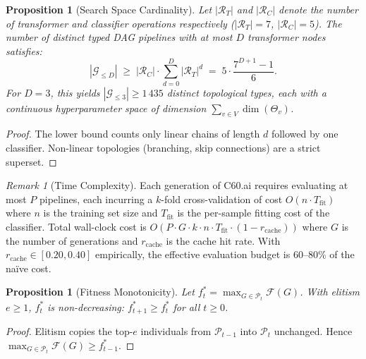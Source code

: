 \documentclass{article}
\theoremstyle{definition}
\theoremstyle{plain}
\newtheorem{proposition}[definition]{Proposition}
\theoremstyle{remark}
\newtheorem{remark}[definition]{Remark}
\begin{document}
\begin{proposition}[Search Space Cardinality]
\label{prop:space}
Let $|\mathcal{R}_T|$ and $|\mathcal{R}_C|$ denote the number of transformer
and classifier operations respectively ($|\mathcal{R}_T| = 7$,
$|\mathcal{R}_C| = 5$).
The number of distinct typed DAG pipelines with at most $D$ transformer
nodes satisfies:
\begin{equation}
  |\mathcal{G}_{\leq D}| \;\geq\;
    |\mathcal{R}_C| \cdot \sum_{d=0}^{D} |\mathcal{R}_T|^d
    \;=\; 5 \cdot \frac{7^{D+1} - 1}{6}.
  \label{eq:space}
\end{equation}
For $D = 3$, this yields $|\mathcal{G}_{\leq 3}| \geq 1\,435$
distinct \emph{topological types}, each with a continuous hyperparameter
space of dimension $\sum_{v \in V} \dim(\Theta_v)$.
\end{proposition}

\begin{proof}
The lower bound counts only linear chains of length $d$ followed by one
classifier.
Non-linear topologies (branching, skip connections) are a strict superset.
\end{proof}

\begin{remark}[Time Complexity]
\label{rem:complexity}
Each generation of C60.ai requires evaluating at most $P$ pipelines,
each incurring a $k$-fold cross-validation of cost $O(n \cdot T_\mathrm{fit})$
where $n$ is the training set size and $T_\mathrm{fit}$ is the per-sample
fitting cost of the classifier.
Total wall-clock cost is $O(P \cdot G \cdot k \cdot n \cdot T_\mathrm{fit}
\cdot (1 - r_\mathrm{cache}))$
where $G$ is the number of generations and $r_\mathrm{cache}$ is the cache
hit rate.
With $r_\mathrm{cache} \in [0.20, 0.40]$ empirically, the effective
evaluation budget is 60--80\% of the na\"ive cost.
\end{remark}

\begin{proposition}[Fitness Monotonicity]
\label{prop:monotone}
Let $f^*_t = \max_{G \in \mathcal{P}_t} \mathcal{F}(G)$.
With elitism $e \geq 1$, $f^*_t$ is non-decreasing: $f^*_{t+1} \geq f^*_t$
for all $t \geq 0$.
\end{proposition}

\begin{proof}
Elitism copies the top-$e$ individuals from $\mathcal{P}_{t-1}$ into
$\mathcal{P}_t$ unchanged.
Hence $\max_{G \in \mathcal{P}_t} \mathcal{F}(G) \geq f^*_{t-1}$.
\end{proof}
\end{document}
